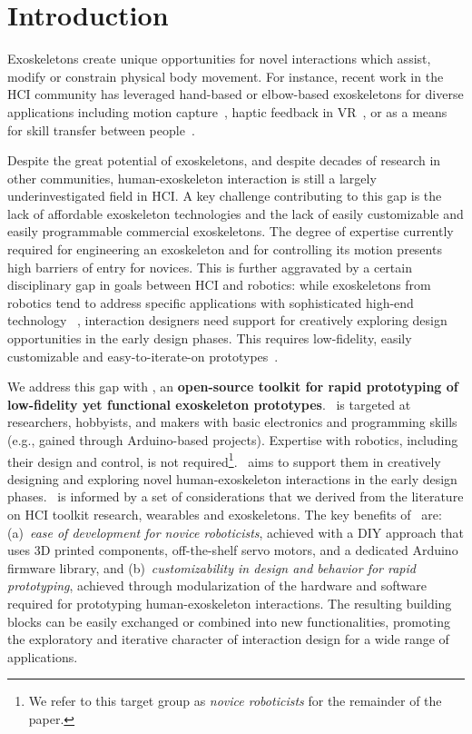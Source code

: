 \section{Introduction}
Exoskeletons create unique opportunities for novel interactions which assist, modify or constrain physical body movement. For instance, recent work in the HCI community has leveraged hand-based or elbow-based exoskeletons for diverse applications including motion capture~\cite{gu_2016}, haptic feedback in VR~\cite{gu_2016, teng_2022}, or as a means for skill transfer between people~\cite{nishida_2022}.

Despite the great potential of exoskeletons, and despite decades of research in other communities, human-exoskeleton interaction is still a largely underinvestigated field in HCI. 
A key challenge contributing to this gap is the lack of affordable exoskeleton technologies and the lack of easily customizable and easily programmable commercial exoskeletons. The degree of expertise currently required for engineering an exoskeleton and for controlling its motion presents high barriers of entry for novices. This is further aggravated by a certain disciplinary gap in goals between HCI and robotics: while exoskeletons from robotics tend to address specific applications with sophisticated high-end technology~\cite{gull_2020,bogue_2018,kapsalyamov_2020}%
, interaction designers need support for creatively exploring design opportunities in the early design phases. This requires low-fidelity, easily customizable and easy-to-iterate-on prototypes~\cite{preece_2015}.

We address this gap with \toolkit, an \textbf{open-source toolkit for rapid prototyping of low-fidelity yet functional exoskeleton prototypes}. \toolkit~is targeted at researchers, hobbyists, and makers with basic electronics and programming skills (e.g., gained through Arduino-based projects). Expertise with robotics, including their design and control, is not required\footnote{We refer to this target group as \textit{novice roboticists} for the remainder of the paper.}. \toolkit~aims to support them in creatively designing and exploring novel human-exoskeleton interactions in the early design phases. 
\toolkit~is informed by a set of considerations that we derived from the literature on HCI toolkit research, wearables and exoskeletons. 
The key benefits of \toolkit~are: (a)~\textit{ease of development for novice roboticists}, achieved with a DIY approach that uses 3D printed components, off-the-shelf servo motors, and a dedicated Arduino firmware library, and (b)~\textit{customizability in design and behavior for rapid prototyping}, achieved through modularization of the hardware and software required for prototyping human-exoskeleton interactions. The resulting building blocks can be easily exchanged or combined into new functionalities, promoting the exploratory and iterative character of interaction design for a wide range of applications. 

